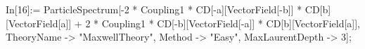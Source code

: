 In[16]:= ParticleSpectrum[-2 * Coupling1 * CD[-a][VectorField[-b]] * CD[b][VectorField[a]] + 2 * Coupling1 * CD[-b][VectorField[-a]] * CD[b][VectorField[a]], TheoryName -> "MaxwellTheory", Method -> "Easy", MaxLaurentDepth -> 3]; 